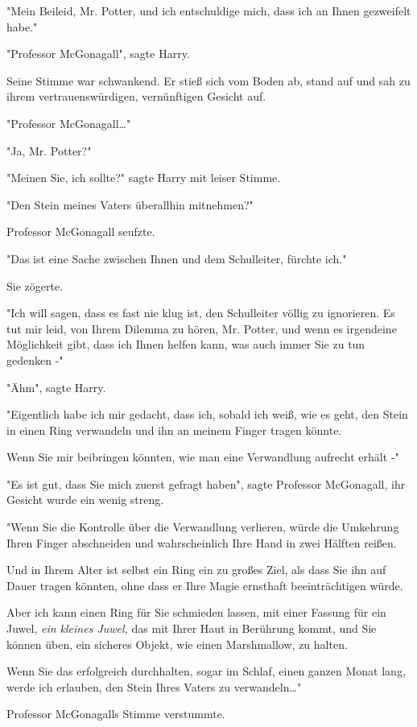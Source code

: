 {"Mein Beileid, Mr. Potter, und ich entschuldige mich, dass ich an Ihnen gezweifelt habe."

"Professor McGonagall", sagte Harry.

Seine Stimme war schwankend. Er stieß sich vom Boden ab, stand auf und sah zu ihrem vertrauenswürdigen, vernünftigen Gesicht auf.

"Professor McGonagall…"

"Ja, Mr. Potter?"

"Meinen Sie, ich sollte?" sagte Harry mit leiser Stimme.

"Den Stein meines Vaters überallhin mitnehmen?"

Professor McGonagall seufzte.

"Das ist eine Sache zwischen Ihnen und dem Schulleiter, fürchte ich."

Sie zögerte.

"Ich will sagen, dass es fast nie klug ist, den Schulleiter völlig zu ignorieren. Es tut mir leid, von Ihrem Dilemma zu hören, Mr. Potter, und wenn es irgendeine Möglichkeit gibt, dass ich Ihnen helfen kann, was auch immer Sie zu tun gedenken -"

"Ähm", sagte Harry.

"Eigentlich habe ich mir gedacht, dass ich, sobald ich weiß, wie es geht, den Stein in einen Ring verwandeln und ihn an meinem Finger tragen könnte.

Wenn Sie mir beibringen könnten, wie man eine Verwandlung aufrecht erhält -"

"Es ist gut, dass Sie mich zuerst gefragt haben", sagte Professor McGonagall, ihr Gesicht wurde ein wenig streng.

"Wenn Sie die Kontrolle über die Verwandlung verlieren, würde die Umkehrung Ihren Finger abschneiden und wahrscheinlich Ihre Hand in zwei Hälften reißen.

Und in Ihrem Alter ist selbst ein Ring ein zu großes Ziel, als dass Sie ihn auf Dauer tragen könnten, ohne dass er Ihre Magie ernsthaft beeinträchtigen würde.

Aber ich kann einen Ring für Sie schmieden lassen, mit einer Fassung für ein Juwel, \emph{ein kleines Juwel,} das mit Ihrer Haut in Berührung kommt, und Sie können üben, ein sicheres Objekt, wie einen Marshmallow, zu halten.

Wenn Sie das erfolgreich durchhalten, sogar im Schlaf, einen ganzen Monat lang, werde ich erlauben, den Stein Ihres Vaters zu verwandeln…"

Professor McGonagalls Stimme verstummte.

}
